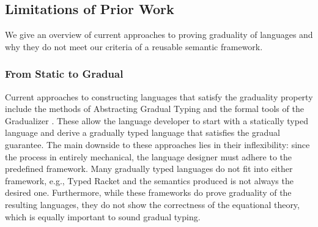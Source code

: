 \subsection{Limitations of Prior Work}

We give an overview of current approaches to proving graduality of
languages and why they do not meet our criteria of a reusable semantic
framework.

\subsubsection{From Static to Gradual}

Current approaches to constructing languages that satisfy the
graduality property include the methods of Abstracting Gradual Typing
\cite{garcia-clark-tanter2016} and the formal tools of the Gradualizer
\cite{cimini-siek2016}.  These allow the language developer to start
with a statically typed language and derive a gradually typed language
that satisfies the gradual guarantee. The main downside to these
approaches lies in their inflexibility: since the process in entirely
mechanical, the language designer must adhere to the predefined
framework.  Many gradually typed languages do not fit into either
framework, e.g., Typed Racket \cite{tobin-hochstadt06,
  tobin-hochstadt08} and the semantics produced is not always the
desired one.
%
Furthermore, while these frameworks do prove graduality of the
resulting languages, they do not show the correctness of the
equational theory, which is equally important to sound gradual typing.





